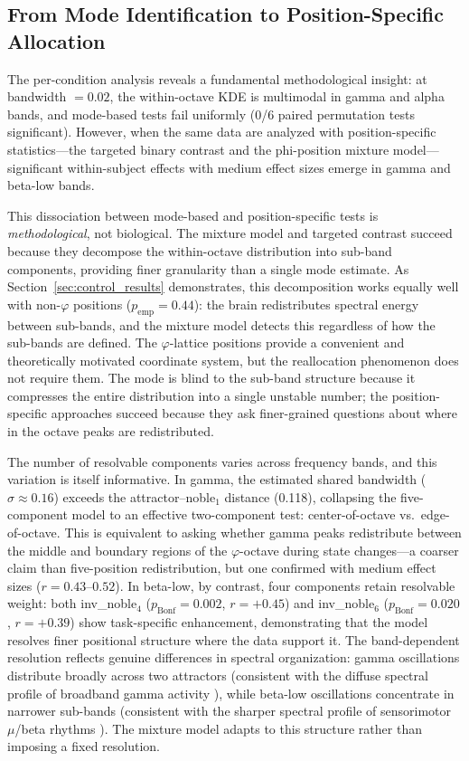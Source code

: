 \documentclass[11pt,a4paper]{article}
\newcommand{\phisym}{\varphi}
\begin{document}
\subsection{From Mode Identification to Position-Specific Allocation}

The per-condition analysis reveals a fundamental methodological insight: at bandwidth $= 0.02$, the within-octave KDE is multimodal in gamma and alpha bands, and mode-based tests fail uniformly (0/6 paired permutation tests significant). However, when the same data are analyzed with position-specific statistics---the targeted binary contrast and the phi-position mixture model---significant within-subject effects with medium effect sizes emerge in gamma and beta-low bands.

This dissociation between mode-based and position-specific tests is \emph{methodological}, not biological. The mixture model and targeted contrast succeed because they decompose the within-octave distribution into sub-band components, providing finer granularity than a single mode estimate. As Section~\ref{sec:control_results} demonstrates, this decomposition works equally well with non-$\phisym$ positions ($p_{\text{emp}} = 0.44$): the brain redistributes spectral energy between sub-bands, and the mixture model detects this regardless of how the sub-bands are defined. The $\phisym$-lattice positions provide a convenient and theoretically motivated coordinate system, but the reallocation phenomenon does not require them. The mode is blind to the sub-band structure because it compresses the entire distribution into a single unstable number; the position-specific approaches succeed because they ask finer-grained questions about where in the octave peaks are redistributed.

The number of resolvable components varies across frequency bands, and this variation is itself informative. In gamma, the estimated shared bandwidth ($\sigma \approx 0.16$) exceeds the attractor--noble$_1$ distance (0.118), collapsing the five-component model to an effective two-component test: center-of-octave vs.\ edge-of-octave. This is equivalent to asking whether gamma peaks redistribute between the middle and boundary regions of the $\phisym$-octave during state changes---a coarser claim than five-position redistribution, but one confirmed with medium effect sizes ($r = 0.43$--$0.52$). In beta-low, by contrast, four components retain resolvable weight: both inv\_noble$_4$ ($p_{\text{Bonf}} = 0.002$, $r = +0.45$) and inv\_noble$_6$ ($p_{\text{Bonf}} = 0.020$, $r = +0.39$) show task-specific enhancement, demonstrating that the model resolves finer positional structure where the data support it. The band-dependent resolution reflects genuine differences in spectral organization: gamma oscillations distribute broadly across two attractors (consistent with the diffuse spectral profile of broadband gamma activity \parencite{fries2009neuronal}), while beta-low oscillations concentrate in narrower sub-bands (consistent with the sharper spectral profile of sensorimotor $\mu$/beta rhythms \parencite{pfurtscheller1999event}). The mixture model adapts to this structure rather than imposing a fixed resolution.
\end{document}
